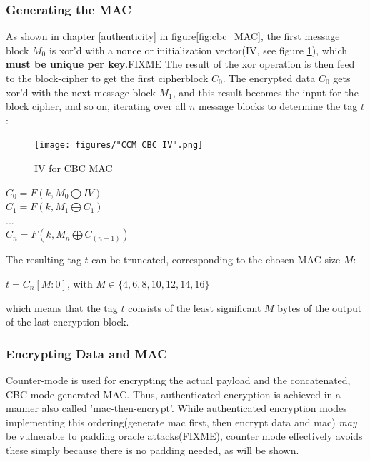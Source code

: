 \subsubsection{Generating the MAC}

As shown in chapter \ref{authenticity} in figure\ref{fig:cbc_MAC}, the first message block $M_0$ is \gls{xor}'d with a nonce or initialization vector(IV, see figure
\ref{fig:ccrMacIV}), which \textbf{must be unique per key}.FIXME
The result of the \gls{xor} operation is then feed to the block-cipher to get the first cipherblock $C_0$. The encrypted data $C_0$ gets \gls{xor}'d with the next message block $M_1$, and this
result becomes the input for the block cipher, and so on, iterating over all $n$ message blocks to determine the tag $t$:

\begin{figure}
    \centering
    \texttt{[image: figures/"CCM CBC IV".png]}
    \caption{IV for CBC MAC}
    \label{fig:ccrMacIV}
\end{figure}


\begin{center}
 $C_0 = F(k, M_0 \bigoplus IV )$
 \\
 $C_1 = F(k, M_1 \bigoplus C_1) $
 \\
 $...$
 \\
 $C_n = F(k, M_n \bigoplus C_{(n-1)})$
 \\
\end{center}

The resulting tag $t$ can be truncated, corresponding to the chosen MAC size $M$:
\begin{center}
  $t = C_n[M:0]$, with $M \in \{4, 6, 8, 10, 12, 14, 16\}$
\end{center}
which means that the tag $t$ consists of the least significant $M$ bytes of the output of the last encryption block.

\subsubsection{Encrypting Data and MAC}

Counter-mode is used for encrypting the actual payload and the concatenated, CBC mode generated MAC.
Thus, authenticated encryption is achieved in a manner also called 'mac-then-encrypt'. While authenticated
encryption modes implementing this ordering(generate mac first, then encrypt data and mac) \textit{may}
be vulnerable to padding oracle attacks(FIXME), counter mode effectively avoids these simply because
there is no padding needed, as will be shown.

